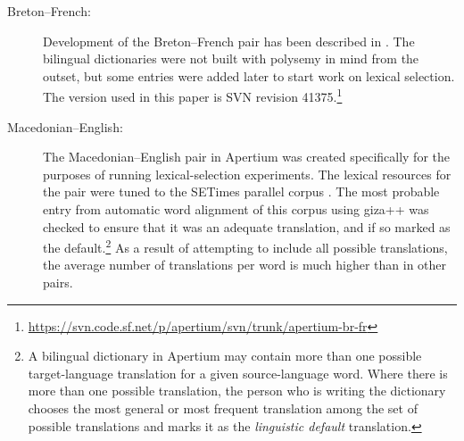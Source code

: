 \documentclass[11pt]{article}
\begin{document}
\begin{description}
\item[Breton--French:] Development of the Breton--French pair has been
  described in \citep{tyers10b}. The bilingual %
  dictionaries were not built with polysemy in mind from the outset,
  but some entries were added later to start work on lexical
  selection. The version used in this paper is SVN revision
  41375.\footnote{\url{https://svn.code.sf.net/p/apertium/svn/trunk/apertium-br-fr}}


\item[Macedonian--English:] The Macedonian--English pair
  in Apertium was created specifically for the purposes of running
  lexical-selection experiments. 
  The lexical resources for the pair were tuned to the SETimes parallel corpus
  \citep{tyers10}.  
  The most probable entry from automatic word alignment of this 
  corpus using {\sc giza++} \citep{och03a} was checked to ensure that it was 
  an adequate translation, and if so marked as the 
  default.\footnote{A bilingual dictionary in Apertium
    \citep{forcada2011apertium} may contain more than one possible
    target-language translation for a given source-language
    word. Where there is more than one possible translation, the
    person who is writing the dictionary chooses the most general or
    most frequent translation among the set of possible translations
    and marks it as the \emph{linguistic default} translation.} As a
  result of attempting to include all possible translations, the
  average number of translations per word is much higher %
than in other pairs.  

\end{description}
\end{document}
